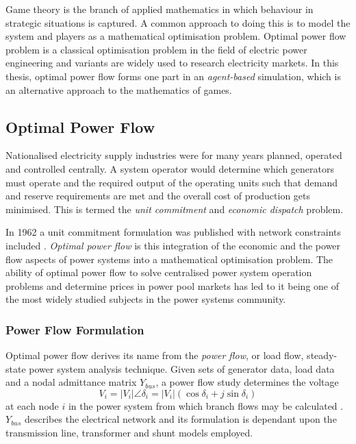 Game theory is the branch of applied mathematics in which behaviour in
strategic situations is captured.  A common approach to doing this is to
model the system and players as a mathematical optimisation problem.  Optimal
power flow problem is a classical optimisation problem in the field of electric
power engineering and variants are widely used to research electricity
markets.  In this thesis, optimal power flow forms one part in an
\textit{agent-based} simulation, which is an alternative approach to the
mathematics of games.

\subsection{Optimal Power Flow}
\label{sec:opf}
Nationalised electricity supply industries were for many years planned,
operated and controlled centrally.  A system operator would determine which
generators must operate and the required output of the operating units such
that demand and reserve requirements are met and the overall cost of
production gets minimised.  This is termed the \textit{unit commitment} and
\textit{economic dispatch} problem.

In 1962 a unit commitment formulation was published with network constraints
included \cite{carpentier:opf}.  \textit{Optimal power flow} is this
integration of the economic and the power flow aspects of power systems into a
mathematical optimisation problem.  The ability of optimal power flow to solve
centralised power system operation problems and determine prices in power
pool markets has led to it being one of the most widely studied subjects in
the power systems community.

\subsubsection{Power Flow Formulation}
\label{sec:pf_form}
Optimal power flow derives its name from the \textit{power flow}, or load flow,
steady-state power system analysis technique.  Given sets of generator data,
load data and a nodal admittance matrix $Y_{bus}$, a power flow study
determines the voltage
\begin{equation}
V_i = \vert V_i \vert \angle\delta_i = \vert
V_i\vert(\cos\delta_i + j\sin\delta_i)
\end{equation}
at each node $i$ in the power system from which branch
flows may be calculated \cite{grainger:psa}. $Y_{bus}$ describes the electrical
network and its formulation is dependant upon the transmission line,
transformer and shunt models employed.

